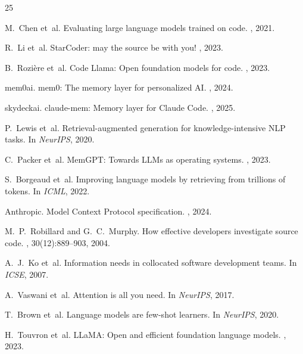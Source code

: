 \documentclass{article}
\begin{document}
\begin{thebibliography}{25}

M.~Chen et~al.
\newblock Evaluating large language models trained on code.
, 2021.

R.~Li et~al.
\newblock StarCoder: may the source be with you!
, 2023.

B.~Rozi\`{e}re et~al.
\newblock Code Llama: Open foundation models for code.
, 2023.

mem0ai.
\newblock mem0: The memory layer for personalized AI.
, 2024.

skydeckai.
\newblock claude-mem: Memory layer for Claude Code.
, 2025.

P.~Lewis et~al.
\newblock Retrieval-augmented generation for knowledge-intensive NLP tasks.
\newblock In {\em NeurIPS}, 2020.

C.~Packer et~al.
\newblock MemGPT: Towards LLMs as operating systems.
, 2023.

S.~Borgeaud et~al.
\newblock Improving language models by retrieving from trillions of tokens.
\newblock In {\em ICML}, 2022.

Anthropic.
\newblock Model Context Protocol specification.
, 2024.

M.~P.~Robillard and G.~C.~Murphy.
\newblock How effective developers investigate source code.
, 30(12):889--903, 2004.

A.~J.~Ko et~al.
\newblock Information needs in collocated software development teams.
\newblock In {\em ICSE}, 2007.

A.~Vaswani et~al.
\newblock Attention is all you need.
\newblock In {\em NeurIPS}, 2017.

T.~Brown et~al.
\newblock Language models are few-shot learners.
\newblock In {\em NeurIPS}, 2020.

H.~Touvron et~al.
\newblock LLaMA: Open and efficient foundation language models.
, 2023.


\end{thebibliography}
\end{document}

